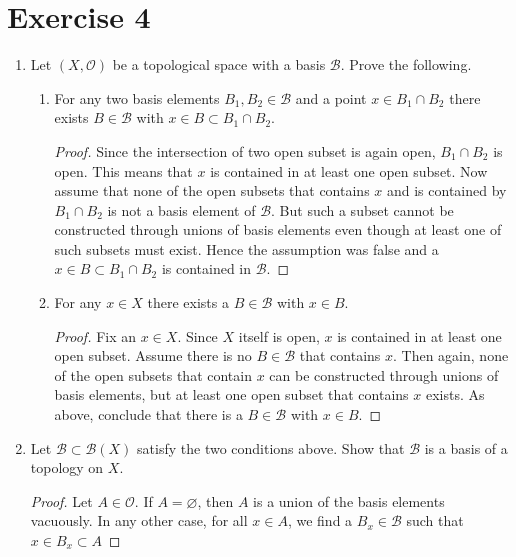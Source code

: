 \documentclass[a4paper]{article}
\begin{document}
    \section*{Exercise 4}
    \begin{enumerate}
        \item Let \((X, \mathcal{O})\) be a topological space with a basis \(\mathcal{B}\). Prove the following.
        \begin{enumerate}
            \item For any two basis elements \(B_1, B_2 \in \mathcal{B}\) and a point \(x \in B_1 \cap B_2\) there exists \(B \in \mathcal{B}\) with \(x \in B \subset B_1 \cap B_2\).
            \begin{proof}
                Since the intersection of two open subset is again open, \(B_1 \cap B_2\) is open. This means that \(x\) is contained in at least one open subset. Now assume that none of the open subsets that contains \(x\) and is contained by \(B_1 \cap B_2\) is not a basis element of \(\mathcal{B}\). But such a subset cannot be constructed through unions of basis elements even though at least one of such subsets must exist. Hence the assumption was false and a \(x \in B \subset B_1 \cap B_2\) is contained in \(\mathcal{B}\).
            \end{proof}
            \item For any \(x \in X\) there exists a \(B \in \mathcal{B}\) with \(x \in B\).
            \begin{proof}
                Fix an \(x \in X\). Since \(X\) itself is open, \(x\) is contained in at least one open subset. Assume there is no \(B \in \mathcal{B}\) that contains \(x\). Then again, none of the open subsets that contain \(x\) can be constructed through unions of basis elements, but at least one open subset that contains \(x\) exists. As above, conclude that there is a \(B \in \mathcal{B}\) with \(x \in B\).
            \end{proof}
        \end{enumerate}
        \item Let \(\mathcal{B} \subset \mathcal{B}(X)\) satisfy the two conditions above. Show that \(\mathcal{B}\) is a basis of a topology on \(X\).
        \begin{proof}
            Let \(A \in \mathcal{O}\). If \(A = \varnothing\), then \(A\) is a union of the basis elements vacuously. In any other case, for all \(x \in A\), we find a \(B_x \in \mathcal{B}\) such that \(x \in B_x \subset A\)
        \end{proof}
    \end{enumerate}
\end{document}
